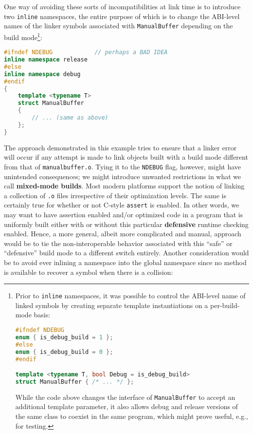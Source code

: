 One way of avoiding these sorts of incompatibilities at link time is to
introduce two \texttt{inline} namespaces, the entire purpose of which is
to change the ABI-level names of the linker symbols associated with
\texttt{ManualBuffer} depending on the build mode{\cprotect\footnote{Prior
to \texttt{inline} namespaces, it was possible to control the
ABI-level name of linked symbols by creating separate template
instantiations on a per-build-mode basis:

\begin{lstlisting}[language=C++, basicstyle={\ttfamily\footnotesize}]
#ifndef NDEBUG
enum { is_debug_build = 1 };
#else
enum { is_debug_build = 0 };
#endif

template <typename T, bool Debug = is_debug_build>
struct ManualBuffer { /* ... */ };
\end{lstlisting}
    
\noindent While the code above changes the interface of \texttt{ManualBuffer} to
accept an additional template parameter, it also allows debug and
release versions of the same class to coexist in the same program,
  which might prove useful, e.g., for testing.}}:

\begin{lstlisting}[language=C++]
#ifndef NDEBUG            // perhaps a BAD IDEA
inline namespace release
#else
inline namespace debug
#endif
{
    template <typename T>
    struct ManualBuffer
    {
        // ... (same as above)
    };
}
\end{lstlisting}
    
\noindent The approach demonstrated in this example tries to ensure that a linker
error will occur if any attempt is made to link objects built with a
build mode different from that of \mbox{\texttt{manualbuffer.o}}. Tying it to
the \texttt{NDEBUG} flag, however, might have unintended consequences;
we might introduce unwanted restrictions in what we call
\textbf{mixed-mode builds}. Most modern platforms support the notion of
linking a collection of \texttt{.o} files irrespective of their
optimization levels. The same is certainly true for whether or not
C-style \texttt{assert} is enabled. In other words, we may want to have
assertion enabled and/or optimized code in a program that is uniformly
built either with or without this particular \textbf{defensive} runtime
checking enabled. Hence, a more general, albeit more complicated and
manual, approach would be to tie the non-interoperable behavior
associated with this ``safe'' or ``defensive'' build mode to a different
switch entirely. Another consideration would be to avoid ever inlining a
namespace into the global namespace since no method is available to
recover a symbol when there is a collision:

